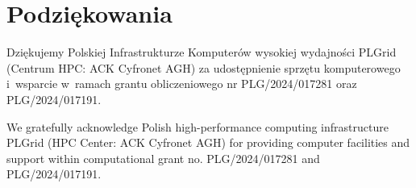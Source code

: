 \documentclass[data-science]{agh-wi} %
\begin{document}
\chapter{Podziękowania}

Dziękujemy Polskiej Infrastrukturze Komputerów wysokiej wydajności PLGrid (Centrum HPC: ACK Cyfronet AGH) za udostępnienie sprzętu komputerowego i~wsparcie w~ramach grantu obliczeniowego nr PLG/2024/017281 oraz PLG/2024/017191.
\vspace*{1.5cm}

We gratefully acknowledge Polish high-performance computing infrastructure PLGrid (HPC Center: ACK Cyfronet AGH) for providing computer facilities and support within computational grant no. PLG/2024/017281 and PLG/2024/017191.


\printbibliography
\end{document}
